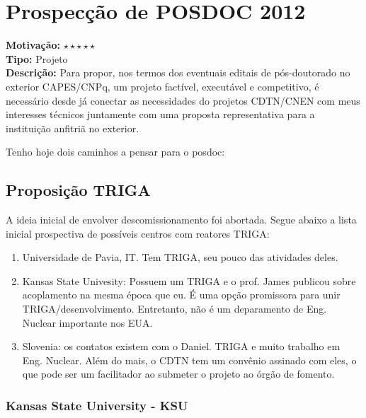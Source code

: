 \chapter{Prospecção de POSDOC 2012}
\label{posdoc}

\textbf{Motivação:} $\star\star\star\star\star$\\

\textbf{Tipo:} Projeto\\

\textbf{Descrição:} Para propor, nos termos dos eventuais editais de pós-doutorado no exterior CAPES/CNPq, um projeto factível, executável e competitivo, é necessário 
desde já conectar as necessidades do projetos CDTN/CNEN com meus interesses técnicos juntamente com uma proposta representativa para a instituição anfitriã 
no exterior.

Tenho hoje dois caminhos a pensar para o posdoc:

\section{Proposição TRIGA}
 
A ideia inicial de envolver descomissionamento foi abortada. Segue abaixo a lista inicial prospectiva de possíveis centros com reatores TRIGA:
 \begin{enumerate}
 	\item Universidade de Pavia, IT. Tem TRIGA, seu pouco das atividades deles.
 	\item Kansas State Univesity: Possuem um TRIGA e o prof. James publicou sobre acoplamento na mesma época que eu. É uma opção promissora para unir TRIGA/desenvolvimento. Entretanto, não é um deparamento de Eng. Nuclear importante nos EUA.
 	\item Slovenia: os contatos existem com o Daniel. TRIGA e muito trabalho em Eng. Nuclear. Além do mais, o CDTN tem um convênio assinado com eles, o que pode 
 	ser um facilitador ao submeter o projeto ao órgão de fomento.
 \end{enumerate}

\subsection{Kansas State University - KSU}

